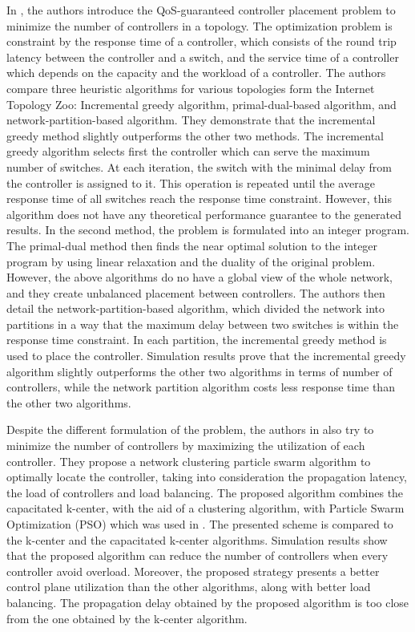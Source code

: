 \documentclass{IEEEtran}
\begin{document}
In \cite{ChWa15}, the authors introduce the QoS-guaranteed controller placement problem to minimize the number of controllers in a topology. The optimization problem is constraint by the response time of a controller, which consists of the round trip latency between the controller and a switch, and the service time of a controller which depends on the capacity and the workload of a controller. The authors compare three heuristic algorithms for various topologies form the Internet Topology Zoo: Incremental greedy algorithm, primal-dual-based algorithm, and network-partition-based algorithm. They demonstrate that the incremental greedy method slightly outperforms the other two methods. The incremental greedy algorithm selects first the controller which can serve the maximum number of switches. At each iteration, the switch with the minimal delay from the controller is assigned to it. This operation is repeated until the average response time of all switches reach the response time constraint. However, this algorithm does not have any theoretical performance guarantee to the generated results. In the second method, the problem is formulated into an integer program. The primal-dual method then finds the near optimal solution to the integer program by using linear relaxation and the duality of the original problem. However, the above algorithms do no have a global view of the whole network, and they create unbalanced placement between controllers. The authors then detail the network-partition-based algorithm, which divided the network into partitions in a way that the maximum delay between two switches is within the response time constraint. In each partition, the incremental greedy method is used to place the controller. Simulation results prove that the incremental greedy algorithm slightly outperforms the other two algorithms in terms of number of controllers, while the network partition algorithm costs less response time than the other two algorithms.

Despite the different formulation of the problem, the authors in \cite{LiWa15} also try to minimize the number of controllers by maximizing the utilization of each controller. They propose a network clustering particle swarm algorithm to optimally locate the controller, taking into consideration the propagation latency, the load of controllers and load balancing. The proposed algorithm combines the capacitated k-center, with the aid of a clustering algorithm, with Particle Swarm Optimization (PSO) which was used in \cite{GaWa15}. The presented scheme is compared to the k-center and the capacitated k-center algorithms. Simulation results show that the proposed algorithm can reduce the number of controllers when every controller avoid overload. Moreover, the proposed strategy presents a better control plane utilization than the other algorithms, along with better load balancing. The propagation delay obtained by the proposed algorithm is too close from the one obtained by the k-center algorithm. 
\end{document}
